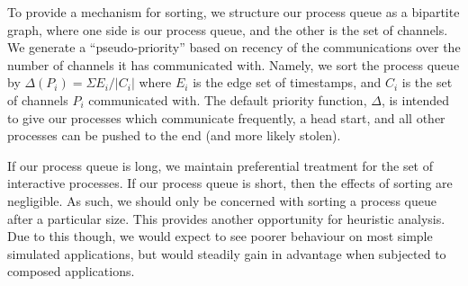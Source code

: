 To provide a mechanism for sorting, we structure our process queue as a bipartite 
graph, where one side is our process queue, and the other is the set of channels.
We generate a ``pseudo-priority'' based on recency of the communications over
the number of channels it has communicated with. Namely, we sort the process queue
by $\Delta(P_i) = \Sigma E_i / |C_i|$ where $E_i$ is the edge set of timestamps,
and $C_i$ is the set of channels $P_i$ communicated with. The default priority function, $\Delta$,
is intended to give our processes which communicate frequently, a head start, and
all other processes can be pushed to the end (and more likely stolen). 

If our process queue is long, we maintain preferential treatment for the set of 
interactive processes. If our process queue is short, then the effects of 
sorting are negligible. As such, we should only be concerned with sorting a
process queue after a particular size. This provides another opportunity for
heuristic analysis. Due to this though, we would expect to see poorer behaviour
on most simple simulated applications, but would steadily gain in advantage
when subjected to composed applications.

